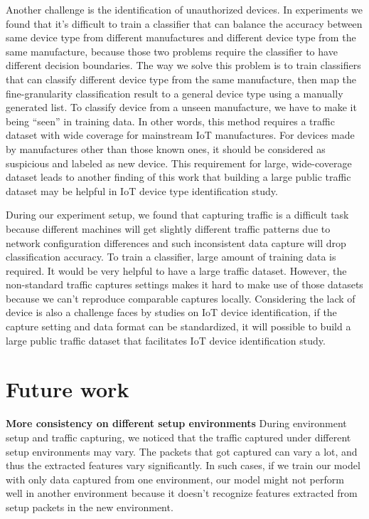\documentclass[twocolumn,10pt]{article}
\begin{document}
Another challenge is the identification of unauthorized devices. In experiments we found that it’s difficult to train a classifier that can balance the accuracy between same device type from different manufactures and different device type from the same manufacture, because those two problems require the classifier to have different decision boundaries. The way we solve this problem is to train classifiers that can classify different device type from the same manufacture, then map the fine-granularity classification result to a general device type using a manually generated list. To classify device from a unseen manufacture, we have to make it being “seen” in training data. In other words, this method requires a traffic dataset with wide coverage for mainstream IoT manufactures. For devices made by manufactures other than those known ones, it should be considered as suspicious and labeled as new device. This requirement for large, wide-coverage dataset leads to another finding of this work that building a large public traffic dataset may be helpful in IoT device type identification study. 

During our experiment setup, we found that capturing traffic is a difficult task because different machines will get slightly different traffic patterns due to network configuration differences and such inconsistent data capture will drop classification accuracy. To train a classifier, large amount of training data is required. It would be very helpful to have a large traffic dataset. However, the non-standard traffic captures settings makes it hard to make use of those datasets because we can’t reproduce comparable captures locally. Considering the lack of device is also a challenge faces by studies on  IoT device identification, if the capture setting and data format can be standardized, it will possible to build a large public traffic dataset that facilitates IoT device identification study.


\section{Future work}

\textbf{More consistency on different setup environments}
During environment setup and traffic capturing, we noticed that the traffic captured under different setup environments may vary. The packets that got captured can vary a lot, and thus the extracted features vary significantly. In such cases, if we train our model with only data captured from one environment, our model might not perform well in another environment because it doesn’t recognize features extracted from setup packets in the new environment. 
\end{document}

